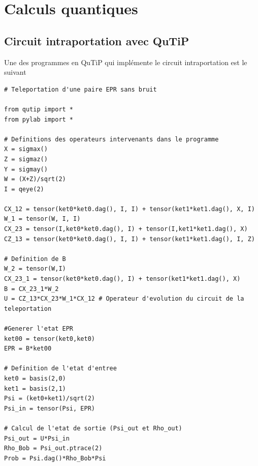 \documentclass[a4paper,12pt]{book}
\numberwithin{equation}{section}
\begin{document}
\section{Calculs quantiques}
\subsection{Circuit intraportation avec QuTiP}
Une des programmes en QuTiP qui implémente le circuit intraportation est le suivant
\begin{lstlisting}
# Teleportation d'une paire EPR sans bruit

from qutip import *
from pylab import *

# Definitions des operateurs intervenants dans le programme
X = sigmax()
Z = sigmaz()
Y = sigmay()
W = (X+Z)/sqrt(2)
I = qeye(2)

CX_12 = tensor(ket0*ket0.dag(), I, I) + tensor(ket1*ket1.dag(), X, I)
W_1 = tensor(W, I, I)
CX_23 = tensor(I,ket0*ket0.dag(), I) + tensor(I,ket1*ket1.dag(), X)
CZ_13 = tensor(ket0*ket0.dag(), I, I) + tensor(ket1*ket1.dag(), I, Z)

# Definition de B
W_2 = tensor(W,I)
CX_23_1 = tensor(ket0*ket0.dag(), I) + tensor(ket1*ket1.dag(), X)
B = CX_23_1*W_2
U = CZ_13*CX_23*W_1*CX_12 # Operateur d'evolution du circuit de la teleportation

#Generer l'etat EPR
ket00 = tensor(ket0,ket0)
EPR = B*ket00

# Definition de l'etat d'entree
ket0 = basis(2,0)
ket1 = basis(2,1)
Psi = (ket0+ket1)/sqrt(2)
Psi_in = tensor(Psi, EPR)

# Calcul de l'etat de sortie (Psi_out et Rho_out)
Psi_out = U*Psi_in
Rho_Bob = Psi_out.ptrace(2)
Prob = Psi.dag()*Rho_Bob*Psi
\end{lstlisting}
\end{document}
